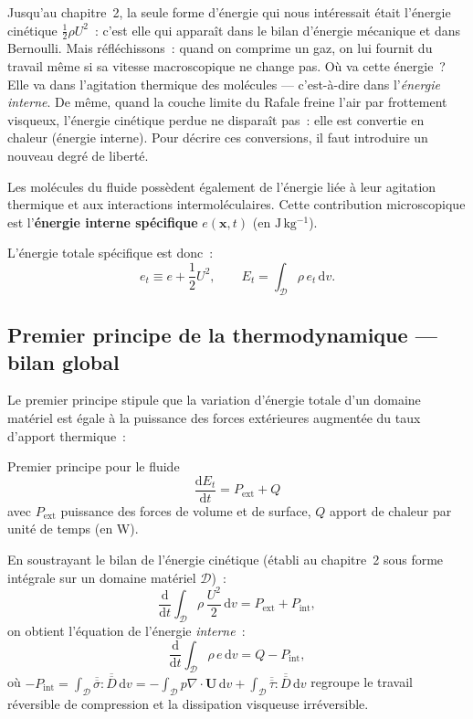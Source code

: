 \documentclass[11pt,a4paper]{report}
\newcommand{\ten}[1]{\overline{\overline{#1}}}   %
\begin{document}
Jusqu'au chapitre~2, la seule forme d'\'energie qui nous int\'eressait \'etait l'\'energie cin\'etique $\tfrac{1}{2}\rho U^2$~: c'est elle qui appara\^it dans le bilan d'\'energie m\'ecanique et dans Bernoulli. Mais r\'efl\'echissons~: quand on comprime un gaz, on lui fournit du travail m\^eme si sa vitesse macroscopique ne change pas. O\`u va cette \'energie~? Elle va dans l'agitation thermique des mol\'ecules --- c'est-\`a-dire dans l'\emph{\'energie interne}. De m\^eme, quand la couche limite du Rafale freine l'air par frottement visqueux, l'\'energie cin\'etique perdue ne dispara\^it pas~: elle est convertie en chaleur (\'energie interne). Pour d\'ecrire ces conversions, il faut introduire un nouveau degr\'e de libert\'e.

Les mol\'ecules du fluide poss\`edent
\'egalement de l'\'energie li\'ee \`a leur agitation thermique et aux interactions
intermol\'eculaires. Cette contribution microscopique est l'\textbf{\'energie interne
sp\'ecifique} $e(\bm{x},t)$ (en $\mathrm{J\,kg^{-1}}$).

L'\'energie totale sp\'ecifique est donc~:
\[
  e_t \equiv e + \frac{1}{2}U^2,
  \qquad
  E_t = \int_{\mathcal{D}} \rho\, e_t\, \mathrm{d}v.
\]

\subsection{Premier principe de la thermodynamique --- bilan global}

Le premier principe stipule que la variation d'\'energie totale d'un domaine
mat\'eriel est \'egale \`a la puissance des forces ext\'erieures augment\'ee du taux
d'apport thermique~:

\begin{importantbox}{Premier principe pour le fluide}
\[
  \frac{\mathrm{d}E_t}{\mathrm{d}t} = P_{\mathrm{ext}} + Q
\]
avec $P_{\mathrm{ext}}$ puissance des forces de volume et de surface,
$Q$ apport de chaleur par unit\'e de temps (en W).
\end{importantbox}

En soustrayant le bilan de l'\'energie cin\'etique (\'etabli au chapitre~2 sous forme
int\'egrale sur un domaine mat\'eriel $\mathcal{D}$)~:
\[
  \frac{\mathrm{d}}{\mathrm{d}t}\int_{\mathcal{D}} \rho\,\frac{U^2}{2}\,\mathrm{d}v
  = P_{\mathrm{ext}} + P_{\mathrm{int}},
\]
on obtient l'\'equation de l'\'energie \emph{interne}~:
\[
  \frac{\mathrm{d}}{\mathrm{d}t}\int_{\mathcal{D}} \rho\,e\,\mathrm{d}v
  = Q - P_{\mathrm{int}},
\]
o\`u $-P_{\mathrm{int}} = \int_{\mathcal{D}} \ten{\sigma} : \ten{D}\,\mathrm{d}v
= -\int_{\mathcal{D}} p\nabla \cdot \bm{U}\,\mathrm{d}v
+ \int_{\mathcal{D}} \ten{\tau} : \ten{D}\,\mathrm{d}v$
regroupe le travail r\'eversible de compression et la dissipation visqueuse irr\'eversible.
\end{document}
